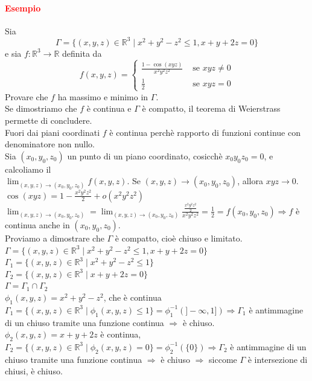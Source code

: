 \documentclass{article}
\newcommand{\R}{\mathbb{R}}
\begin{document}
\paragraph{\textcolor{red}{Esempio}}
Sia 
\begin{equation*}
    \Gamma=\{(x,y,z)\in\R^3\mid x^2+y^2-z^2\leq 1, x+y+2z=0\} 
\end{equation*}
e sia $f:\R^3\rightarrow \R $ definita da 
\begin{equation*}
    f(x,y,z)=\begin{cases}
        \frac{1-\cos(xyz)}{x^2y^2z^2}&\text{  se  }xyz\neq 0\\
        \frac{1}{2}&\text{  se  }xyz= 0
    \end{cases}
\end{equation*}
Provare che $f$ ha massimo e minimo in $\Gamma$.\\
Se dimostriamo che $f$ è continua e $\Gamma$ è compatto, il teorema di Weierstrass permette di concludere.\\
Fuori dai piani coordinati $f$ è continua perchè rapporto di funzioni continue con denominatore non nullo.\\
Sia $(x_0,y_0,z_0)$ un punto di un piano coordinato, cosicchè $x_0y_0z_0=0$, e calcoliamo il\\ $\lim_{(x,y,z)\rightarrow(x_0,y_0,z_0)}f(x,y,z)$. Se $(x,y,z)\rightarrow(x_0,y_0,z_0)$, allora $xyz\rightarrow0$.\\
$\cos(xyz)=1-\frac{x^2y^2z^2}{2}+o(x^2y^2z^2)$\\
$\lim_{(x,y,z)\rightarrow(x_0,y_0,z_0)}=\lim_{(x,y,z)\rightarrow(x_0,y_0,z_0)}\frac{\frac{x^2y^2z^2}{2}}{x^2y^2z^2}=\frac{1}{2}=f(x_0,y_0,z_0) \Rightarrow f$ è continua anche in $(x_0,y_0,z_0)$.\\
Proviamo a dimostrare che $\Gamma$ è compatto, cioè chiuso e limitato. \\
$\Gamma=\{(x,y,z)\in\R^3\mid x^2+y^2-z^2\leq 1, x+y+2z=0\} $\\
$\Gamma_1=\{(x,y,z)\in\R^3\mid x^2+y^2-z^2\leq 1\}$\\
$\Gamma_2=\{(x,y,z)\in\R^3\mid x+y+2z=0\}$\\
$\Gamma=\Gamma_1\cap\Gamma_2$   \\
$\phi_1(x,y,z)=x^2+y^2-z^2$, che è continua $\Gamma_1=\{(x,y,z)\in\R^3\mid \phi_1(x,y,z)\leq 1\}=\phi_1^{-1}(]-\infty,1])\Rightarrow \Gamma_1$ è antimmagine di un chiuso tramite una funzione continua $\Rightarrow$ è chiuso.\\
$\phi_2(x,y,z)=x+y+2z$ è continua, $\Gamma_2=\{(x,y,z)\in\R^3\mid \phi_2(x,y,z)= 0\}=\phi_2^{-1}(\{0\})\Rightarrow\Gamma_2$ è antimmagine di un chiuso tramite una funzione continua $\Rightarrow$ è chiuso $\Rightarrow$ siccome $\Gamma$ è intersezione di chiusi, è chiuso.\\
\end{document}
